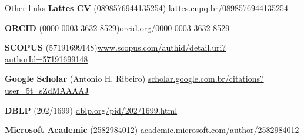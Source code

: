 \documentclass{resume} %
\begin{document}






\begin{rSection}{Other links}
{\bf Lattes CV} {(0898576944135254)} \hfill\href{http://lattes.cnpq.br/0898576944135254}{lattes.cnpq.br/0898576944135254}

{\bf ORCID} {(0000-0003-3632-8529)}\hfill {\href{https://orcid.org/0000-0003-3632-8529}{orcid.org/0000-0003-3632-8529}}

{\bf SCOPUS} {(57191699148)}\hfill{\href{https://www.scopus.com/authid/detail.uri?authorId=57191699148}{www.scopus.com/authid/detail.uri?authorId=57191699148}}

{\bf Google Scholar} {(Antonio H. Ribeiro)}\hfill
{\href{https://scholar.google.com.br/citations?user=5t_sZdMAAAAJ}{scholar.google.com.br/citations?user=5t\_sZdMAAAAJ}}

{\bf DBLP} {(202/1699)}\hfill{
\href{https://dblp.org/pid/202/1699.html}{dblp.org/pid/202/1699.html}}

{\bf Microsoft Academic} {(2582984012)}\hfill{
\href{https://academic.microsoft.com/author/2582984012}{academic.microsoft.com/author/2582984012}}


\end{rSection}
\end{document}
